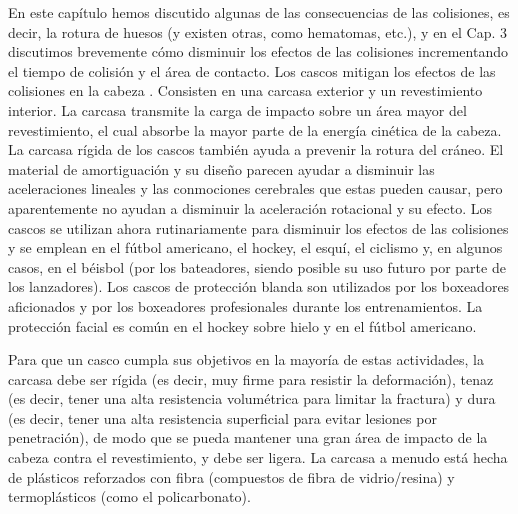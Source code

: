 \documentclass[12pt]{book}
\begin{document}
En este capítulo hemos discutido algunas de las consecuencias de las colisiones, es decir, la rotura de huesos (y existen otras, como hematomas, etc.), y en el Cap. 3 discutimos brevemente cómo disminuir los efectos de las colisiones incrementando el tiempo de colisión y el área de contacto. Los cascos mitigan los efectos de las colisiones en la cabeza \cite{55}. Consisten en una carcasa exterior y un revestimiento interior. La carcasa transmite la carga de impacto sobre un área mayor del revestimiento, el cual absorbe la mayor parte de la energía cinética de la cabeza. La carcasa rígida de los cascos también ayuda a prevenir la rotura del cráneo. El material de amortiguación y su diseño parecen ayudar a disminuir las aceleraciones lineales y las conmociones cerebrales que estas pueden causar, pero aparentemente no ayudan a disminuir la aceleración rotacional y su efecto. Los cascos se utilizan ahora rutinariamente para disminuir los efectos de las colisiones y se emplean en el fútbol americano, el hockey, el esquí, el ciclismo y, en algunos casos, en el béisbol (por los bateadores, siendo posible su uso futuro por parte de los lanzadores). Los cascos de protección blanda son utilizados por los boxeadores aficionados y por los boxeadores profesionales durante los entrenamientos. La protección facial es común en el hockey sobre hielo y en el fútbol americano.

Para que un casco cumpla sus objetivos en la mayoría de estas actividades, la carcasa debe ser rígida (es decir, muy firme para resistir la deformación), tenaz (es decir, tener una alta resistencia volumétrica para limitar la fractura) y dura (es decir, tener una alta resistencia superficial para evitar lesiones por penetración), de modo que se pueda mantener una gran área de impacto de la cabeza contra el revestimiento, y debe ser ligera. La carcasa a menudo está hecha de plásticos reforzados con fibra (compuestos de fibra de vidrio/resina) y termoplásticos (como el policarbonato).
\end{document}
